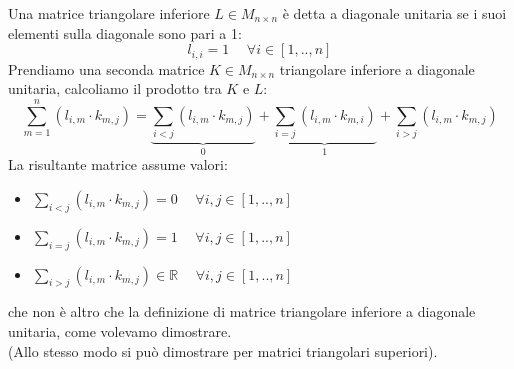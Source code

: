 \begin{flushleft}
Una matrice triangolare inferiore $L \in M_{n \times n}$ è detta a diagonale unitaria se i suoi elementi sulla diagonale sono pari a 1:
\[
l_{i,i}=1 \hspace{15pt} \forall i \in [1,..,n] 
\]
Prendiamo una seconda matrice $K \in M_{n \times n}$ triangolare inferiore a diagonale unitaria, calcoliamo il prodotto tra $K$ e $L$:
\[
\sum_{m=1}^n (l_{i,m} \cdot k_{m,j}) = \underbrace{ \sum_{i<j} (l_{i,m} \cdot k_{m,j}) }_{0} + \underbrace{ \sum_{i=j} (l_{i,m} \cdot k_{m,i}) }_{1} + \sum_{i>j} (l_{i,m}\cdot k_{m,j})
\]
La risultante matrice assume valori:
\begin{itemize}
\item $\sum_{i<j} (l_{i,m} \cdot k_{m,j}) = 0 \hspace{15pt} \forall i,j \in [1,..,n] $ 
\item $\sum_{i=j} (l_{i,m} \cdot k_{m,j}) = 1 \hspace{15pt} \forall i,j \in [1,..,n] $ 
\item $\sum_{i>j} (l_{i,m} \cdot k_{m,j}) \in  \mathbb{R} \hspace{15pt} \forall i,j \in [1,..,n] $ 
\end{itemize}
che non è altro che la definizione di matrice triangolare inferiore a diagonale unitaria, come volevamo dimostrare.\\

(Allo stesso modo si può dimostrare per matrici triangolari superiori).
\end{flushleft}